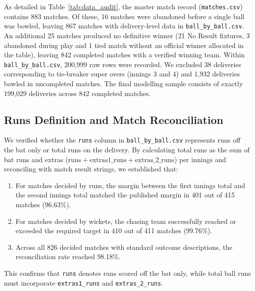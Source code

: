 \documentclass[11pt,a4paper]{article}
\begin{document}


As detailed in Table~\ref{tab:data_audit}, the master match record (\texttt{matches.csv}) contains 883 matches. Of these, 16 matches were abandoned before a single ball was bowled, leaving 867 matches with delivery-level data in \texttt{ball\_by\_ball.csv}. An additional 25 matches produced no definitive winner (21 No Result fixtures, 3 abandoned during play and 1 tied match without an official winner allocated in the table), leaving 842 completed matches with a verified winning team. Within \texttt{ball\_by\_ball.csv}, 200,999 raw rows were recorded. We excluded 38 deliveries corresponding to tie-breaker super overs (innings 3 and 4) and 1,932 deliveries bowled in uncompleted matches. The final modelling sample consists of exactly 199,029 deliveries across 842 completed matches.

\subsection{Runs Definition and Match Reconciliation}
We verified whether the \texttt{runs} column in \texttt{ball\_by\_ball.csv} represents runs off the bat only or total runs on the delivery. By calculating total runs as the sum of bat runs and extras ($\text{runs} + \text{extras1\_runs} + \text{extras\_2\_runs}$) per innings and reconciling with match result strings, we established that:
\begin{enumerate}
    \item For matches decided by runs, the margin between the first innings total and the second innings total matched the published margin in 401 out of 415 matches (96.63\%).
    \item For matches decided by wickets, the chasing team successfully reached or exceeded the required target in 410 out of 411 matches (99.76\%).
    \item Across all 826 decided matches with standard outcome descriptions, the reconciliation rate reached 98.18\%.
\end{enumerate}
This confirms that \texttt{runs} denotes runs scored off the bat only, while total ball runs must incorporate \texttt{extras1\_runs} and \texttt{extras\_2\_runs}.
\end{document}
